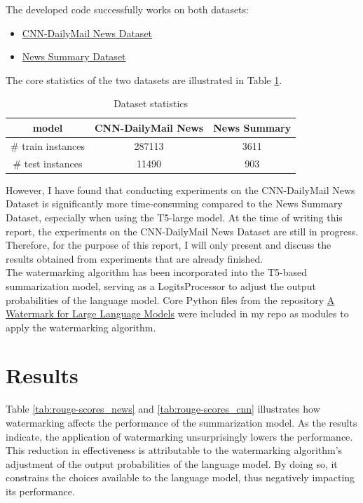 \documentclass{article}
\begin{document}
The developed code successfully works on both datasets:
\begin{itemize}
	\item \href{https://www.kaggle.com/datasets/gowrishankarp/newspaper-text-summarization-cnn-dailymail}{CNN-DailyMail News Dataset}
	\item \href{https://www.kaggle.com/datasets/sunnysai12345/news-summary}{News Summary Dataset}
\end{itemize}

The core statistics of the two datasets are illustrated in Table \ref{tab:dataset_stat}.

\begin{table}[H]
	\begin{tabular}{|c|c|c|}
		\hline
		model              & CNN-DailyMail News & News Summary \\ \hline
		\# train instances & 287113            & 3611         \\ \hline
		\# test instances  & 11490             & 903          \\ \hline
	\end{tabular}
	\caption{Dataset statistics}
	\label{tab:dataset_stat}
\end{table}

However, I have found that conducting experiments on the CNN-DailyMail News Dataset is significantly more time-consuming compared to the News Summary Dataset, especially when using the T5-large model. At the time of writing this report, the experiments on the CNN-DailyMail News Dataset are still in progress. Therefore, for the purpose of this report, I will only present and discuss the results obtained from experiments that are already finished. \\

The watermarking algorithm has been incorporated into the T5-based summarization model, serving as a LogitsProcessor to adjust the output probabilities of the language model. Core Python files from the repository \href{https://github.com/jwkirchenbauer/lm-watermarking}{A Watermark for Large Language Models} were included in my repo as modules to apply the watermarking algorithm.

\section{Results}
Table \ref{tab:rouge-scores_news} and \ref{tab:rouge-scores_cnn} illustrates how watermarking affects the performance of the summarization model. As the results indicate, the application of watermarking unsurprisingly lowers the performance. This reduction in effectiveness is attributable to the watermarking algorithm's adjustment of the output probabilities of the language model. By doing so, it constrains the choices available to the language model, thus negatively impacting its performance.\\
\end{document}
